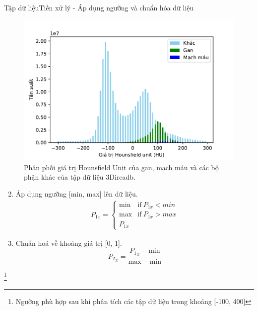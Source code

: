 \documentclass[
	10pt,                %
	aspectratio=169,     %
]{beamer}
\begin{document}
	\begin{frame}{Tập dữ liệu}{Tiền xử lý - Áp dụng ngưỡng và chuẩn hóa dữ liệu}
	    \vspace{-3mm}
	    \begin{minipage}[t]{.52\textwidth}
			\begin{figure}[h!]
		     \includegraphics[scale=0.5]{figures/dataset/histogram_preprocess.pdf}
			    \caption{Phân phối giá trị Hounsfield Unit của gan, mạch máu và các bộ phận khác của tập dữ liệu 3Dircadb.}
		\end{figure}
	    \end{minipage}\hspace*{2mm}%
		\begin{minipage}[t]{.48\textwidth}
			\begin{enumerate}
			\setcounter{enumi}{1}
			\vspace{0.4cm}
			\item Áp dụng ngưỡng [min, max] lên dữ liệu.
			\begin{align}
                {P_{1x}} = \begin{cases} 
                    \mathrm{min} & \text{if}\ P_{1x} < min \\
                    \mathrm{max} & \text{if}\ P_{1x} > max \\
                    P_{1x}
                \end{cases}
            \end{align}
			\item Chuẩn hoá về khoảng giá trị [0, 1].
			\begin{equation}
			{P_2}_x=\dfrac{{P_1}_x - \mathrm{min}}{\mathrm{max} - \mathrm{min}}
			\end{equation}
		\end{enumerate}
	    \end{minipage}
	    
	    \vspace{-8mm}\let\thefootnote\relax\footnote{\hspace{-3mm}\tiny *Ngưỡng phù hợp sau khi phân tích các tập dữ liệu trong khoảng [-100, 400]}
 	\end{frame}
	
\end{document}
